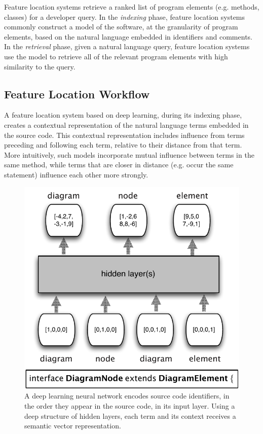 
%      
%

Feature location systems retrieve a ranked list of program elements
(e.g. methods, classes) for a developer query. In the {\em indexing}
phase, feature location systems commonly construct a model of the
software, at the granularity of program elements, based on the natural
language embedded in identifiers and comments. In the {\em retrieval}
phase, given a natural language query, feature location systems use
the model to retrieve all of the relevant program elements with high
similarity to the query.

\subsection{Feature Location Workflow}

A feature location system based on deep learning, during its indexing
phase, creates a contextual representation of the natural language
terms embedded in the source code. This contextual representation
includes influence from terms preceding and following each term,
relative to their distance from that term. More intuitively, such
models incorporate mutual influence between terms in the same method,
while terms that are closer in distance (e.g. occur the same
statement) influence each other more strongly. 



\begin{figure}[tb]
\centering
\includegraphics[width=.9\columnwidth]{figures/neuralnet.pdf}
\caption{A deep learning neural network encodes source code identifiers,
in the order they appear in the source code, in its input
layer. Using a deep structure of hidden layers, each term and its
context receives a semantic vector representation.}
\label{fig:neuralnet}
\end{figure}



